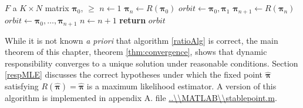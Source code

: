 \begin{table}

\begin{algorithm}[H]
\caption{Dynamic Responsibility Algorithm}\label{ratioAlg}
\begin{algorithmic}
\Require $F$ a $K\times N$ matrix
\Require $\bm\pi_0$, $\ge$
	\State $n \gets 1$
	\State $\bm\pi_n \gets R(\bm\pi_0)$
	\State $orbit \gets {\bm\pi_0,\bm\pi_1}$
		\State $\bm\pi_{n+1} \gets R(\bm\pi_n)$
		\State $orbit \gets {\bm\pi_0,\ldots,\bm\pi_{n+1}}$
		\State $n\gets n+1$
	\EndWhile
	\State \textbf{return} $orbit$ 
\EndProcedure
\end{algorithmic}
\end{algorithm}
\caption{The main algorithm: Iteration of the\Rpi F map.}
\end{table}

While it is not known \textit{a priori} that algorithm \ref{ratioAlg} is correct, the main theorem of this chapter, theorem \ref{thm:convergence}, shows that dynamic responsibility converges to a unique solution under reasonable conditions.  Section \ref{respMLE} discusses the correct hypotheses under which the fixed point $\hat{\bm\pi}$ satisfying $R(\hat{\bm\pi})=\hat{\bm\pi}$ is a maximum likelihood estimator.  A version of this algorithm is implemented in appendix A.  file \url{..\\MATLAB\\stablepoint.m}.
